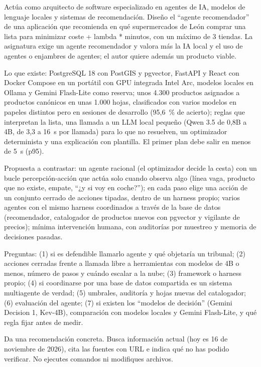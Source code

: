 \begin{tcolorbox}[colback=promptcolor, title=Prompt Introducido, colframe=blue!50!black, breakable]
	Actúa como arquitecto de software especializado en agentes de IA, modelos de lenguaje locales y sistemas de recomendación. Diseño el ``agente recomendador'' de una aplicación que recomienda en qué supermercados de León comprar una lista para minimizar coste + lambda * minutos, con un máximo de 3 tiendas. La asignatura exige un agente recomendador y valora más la IA local y el uso de agentes o enjambres de agentes; el autor quiere además un producto viable.

	Lo que existe: PostgreSQL 18 con PostGIS y pgvector, FastAPI y React con Docker Compose en un portátil con GPU integrada Intel Arc, modelos locales en Ollama y Gemini Flash-Lite como reserva; unos 4.300 productos asignados a productos canónicos en unas 1.000 hojas, clasificados con varios modelos en papeles distintos pero en sesiones de desarrollo (95,6~\% de acierto); reglas que interpretan la lista, una llamada a un LLM local pequeño (Qwen 3.5 de 0,8B a 4B, de 3,3 a 16~s por llamada) para lo que no resuelven, un optimizador determinista y una explicación con plantilla. El primer plan debe salir en menos de 5~s (p95).

	Propuesta a contrastar: un agente racional (el optimizador decide la cesta) con un bucle percepción-acción que actúa solo cuando observa algo (línea vaga, producto que no existe, empate, ``¿y si voy en coche?''); en cada paso elige una acción de un conjunto cerrado de acciones tipadas, dentro de un harness propio; varios agentes con el mismo harness coordinados a través de la base de datos (recomendador, catalogador de productos nuevos con pgvector y vigilante de precios); mínima intervención humana, con auditorías por muestreo y memoria de decisiones pasadas.

	Preguntas: (1) si es defendible llamarlo agente y qué objetaría un tribunal; (2) acciones cerradas frente a llamada libre a herramientas con modelos de 4B o menos, número de pasos y cuándo escalar a la nube; (3) framework o harness propio; (4) si coordinarse por una base de datos compartida es un sistema multiagente de verdad; (5) umbrales, auditoría y hojas nuevas del catalogador; (6) evaluación del agente; (7) si existen los ``modelos de decisión'' (Gemini Decision 1, Kev-4B), comparación con modelos locales y Gemini Flash-Lite, y qué regla fijar antes de medir.

	Da una recomendación concreta. Busca información actual (hoy es 16 de noviembre de 2026), cita las fuentes con URL e indica qué no has podido verificar. No ejecutes comandos ni modifiques archivos.
\end{tcolorbox}

